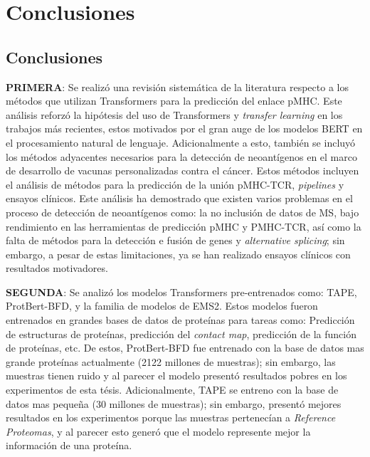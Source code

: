 \chapter{Conclusiones}
\label{cap:conclusiones}


\section{Conclusiones}

\textbf{PRIMERA}: Se realizó una revisión sistemática de la literatura respecto a los métodos que utilizan Transformers para la predicción del enlace pMHC. Este análisis reforzó la hipótesis del uso de Transformers y \textit{transfer learning} en los trabajos más recientes, estos motivados por el gran auge de los modelos BERT en el procesamiento natural de lenguaje. Adicionalmente a esto, también se incluyó los métodos adyacentes necesarios para la detección de neoantígenos en el marco de desarrollo de vacunas personalizadas contra el cáncer. Estos métodos incluyen el análisis de métodos para la predicción de la unión pMHC-TCR, \textit{pipelines} y ensayos clínicos. Este análisis ha demostrado que existen varios problemas en el proceso de detección de neoantígenos como: la no inclusión de datos de MS, bajo rendimiento en las herramientas de predicción pMHC y PMHC-TCR, así como la falta de métodos para la detección e fusión de genes y \textit{alternative splicing}; sin embargo, a pesar de estas limitaciones, ya se han realizado ensayos clínicos con resultados motivadores.

\textbf{SEGUNDA}: Se analizó los modelos Transformers pre-entrenados como: TAPE, ProtBert-BFD, y la familia de modelos de EMS2. Estos modelos fueron entrenados en grandes bases de datos de proteínas para tareas como: Predicción de estructuras de proteínas, predicción del \textit{contact map}, predicción de la función de proteínas, etc. De estos, ProtBert-BFD fue entrenado con la base de datos mas grande proteínas actualmente (2122 millones de muestras); sin embargo, las muestras tienen ruido y al parecer el modelo presentó resultados pobres en los experimentos de esta tésis. Adicionalmente, TAPE se entreno con la base de datos mas pequeña (30 millones de muestras); sin embargo, presentó mejores resultados en los experimentos porque las muestras pertenecían a \textit{Reference Proteomas}, y al parecer esto generó que el modelo represente mejor la información de una proteína.

